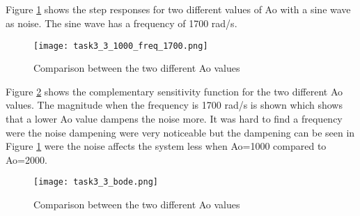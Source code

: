 \subsection{}

Figure \ref{fig:task3_3_1000_freq_1700} shows the step responses for two different values of Ao with a sine wave as noise. The sine wave has a frequency of 1700 rad/s.
\begin{figure}[H]
	\begin{center}
	
		\texttt{[image: task3\_3\_1000\_freq\_1700.png]}
		\caption{Comparison between the two different Ao values}
		\label{fig:task3_3_1000_freq_1700}
	\end{center}
\end{figure}

Figure \ref{fig:task3_3_bode} shows the complementary sensitivity function for the two different Ao values. The magnitude when the frequency is 1700 rad/s is shown which shows that a lower Ao value dampens the noise more. It was hard to find a frequency were the noise dampening were very noticeable but the dampening can be seen in Figure \ref{fig:task3_3_1000_freq_1700} were the noise affects the system less when Ao=1000 compared to Ao=2000.

\begin{figure}[H]
	\begin{center}
	
		\texttt{[image: task3\_3\_bode.png]}
		\caption{Comparison between the two different Ao values}
		\label{fig:task3_3_bode}
	\end{center}
\end{figure}


%
